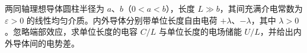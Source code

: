 两同轴理想导体圆柱半径为 $a$、$b$（$0<a<b$），长度 $L\gg b$，其间充满介电常数为 $\varepsilon>0$ 的线性均匀介质。内外导体分别带单位长度自由电荷 $+\lambda$、$-\lambda$，其中 $\lambda>0$。忽略端部效应，求单位长度的电容 $C/L$ 与单位长度的电场储能 $U/L$，并给出内外导体间的电势差。
